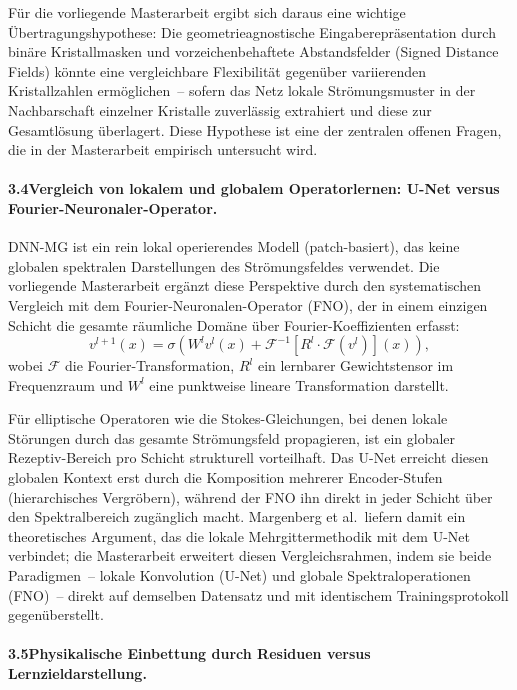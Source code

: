 \documentclass[a4paper,12pt]{article}
\begin{document}
Für die vorliegende Masterarbeit ergibt sich daraus eine wichtige
Übertragungshypothese: Die geometrieagnostische Eingaberepräsentation
durch binäre Kristallmasken und vorzeichenbehaftete Abstandsfelder
(Signed Distance Fields) könnte eine vergleichbare Flexibilität
gegenüber variierenden Kristallzahlen ermöglichen~-- sofern das
Netz lokale Strömungsmuster in der Nachbarschaft einzelner Kristalle
zuverlässig extrahiert und diese zur Gesamtlösung überlagert.
Diese Hypothese ist eine der zentralen offenen Fragen, die in der
Masterarbeit empirisch untersucht wird.

\paragraph{3.4\quad Vergleich von lokalem und globalem Operatorlernen:
U-Net versus Fourier-Neuronaler-Operator.}

DNN-MG ist ein rein lokal operierendes Modell (patch-basiert),
das keine globalen spektralen Darstellungen des Strömungsfeldes verwendet.
Die vorliegende Masterarbeit ergänzt diese Perspektive durch den
systematischen Vergleich mit dem Fourier-Neuronalen-Operator (FNO),
der in einem einzigen Schicht die gesamte räumliche Domäne über
Fourier-Koeffizienten erfasst:
\begin{equation}
    v^{l+1}(x) = \sigma\!\left(
        W^l v^l(x) + \mathcal{F}^{-1}\!\left[R^l \cdot \mathcal{F}(v^l)\right](x)
    \right),
\end{equation}
wobei $\mathcal{F}$ die Fourier-Transformation, $R^l$ ein lernbarer
Gewichtstensor im Frequenzraum und $W^l$ eine punktweise lineare
Transformation darstellt.

Für elliptische Operatoren wie die Stokes-Gleichungen, bei denen
lokale Störungen durch das gesamte Strömungsfeld propagieren, ist
ein globaler Rezeptiv-Bereich pro Schicht strukturell vorteilhaft.
Das U-Net erreicht diesen globalen Kontext erst durch die Komposition
mehrerer Encoder-Stufen (hierarchisches Vergröbern), während der FNO
ihn direkt in jeder Schicht über den Spektralbereich zugänglich macht.
Margenberg et al.\ liefern damit ein theoretisches Argument,
das die lokale Mehrgittermethodik mit dem U-Net verbindet;
die Masterarbeit erweitert diesen Vergleichsrahmen, indem sie
beide Paradigmen~-- lokale Konvolution (U-Net) und globale
Spektraloperationen (FNO)~-- direkt auf demselben Datensatz
und mit identischem Trainingsprotokoll gegenüberstellt.

\paragraph{3.5\quad Physikalische Einbettung durch Residuen versus Lernzieldarstellung.}
\end{document}
